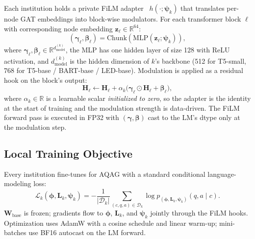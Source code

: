 \documentclass[11pt]{article}
\theoremstyle{plain}
\theoremstyle{definition}
\theoremstyle{remark}
\begin{document}
Each institution holds a private FiLM
adapter~\citep{perez2018film} $h(\cdot;
\boldsymbol{\psi}_k)$ that translates per-node GAT
embeddings into block-wise modulators. For each
transformer block $\ell$ with corresponding node
embedding $\mathbf{z}_\ell \in \mathbb{R}^{64}$:
\begin{equation}
  (\boldsymbol{\gamma}_\ell, \boldsymbol{\beta}_\ell)
  = \mathrm{Chunk}\!\left(
      \mathrm{MLP}(\mathbf{z}_\ell;
      \boldsymbol{\psi}_k)
    \right),
  \label{eq:film_mlp}
\end{equation}
where $\boldsymbol{\gamma}_\ell, \boldsymbol{\beta}_\ell
\in \mathbb{R}^{d_{\text{model}}^{(k)}}$, the MLP
has one hidden layer of size 128 with ReLU activation,
and $d_{\text{model}}^{(k)}$ is the hidden dimension
of $k$'s backbone (512 for T5-small, 768 for T5-base /
BART-base / LED-base). Modulation is applied as a
residual hook on the block's output:
\begin{equation}
  \mathbf{H}_\ell \leftarrow \mathbf{H}_\ell
  + \alpha_k \bigl(\boldsymbol{\gamma}_\ell \odot
  \mathbf{H}_\ell + \boldsymbol{\beta}_\ell\bigr),
  \label{eq:film_modulation}
\end{equation}
where $\alpha_k \in \mathbb{R}$ is a learnable scalar
\emph{initialized to zero}, so the adapter is the
identity at the start of training and the modulation
strength is data-driven. The FiLM forward pass is
executed in FP32 with $(\boldsymbol{\gamma},
\boldsymbol{\beta})$ cast to the LM's dtype only at
the modulation step.

\subsection{Local Training Objective}
\label{sec:local_obj}

Every institution fine-tunes for AQAG with a standard
conditional language-modeling loss:
\begin{equation}
  \mathcal{L}_k(\boldsymbol{\phi}, \mathbf{L}_k,
  \boldsymbol{\psi}_k)
  = -\frac{1}{|\mathcal{D}_k|}
  \!\!\sum_{(c,q,a) \in \mathcal{D}_k}\!\!
    \log p_{(\boldsymbol{\phi}, \mathbf{L}_k,
    \boldsymbol{\psi}_k)}(q, a \mid c).
  \label{eq:local_loss}
\end{equation}
$\mathbf{W}_{\text{base}}$ is frozen; gradients flow
to $\boldsymbol{\phi}$, $\mathbf{L}_k$, and
$\boldsymbol{\psi}_k$ jointly through the FiLM hooks.
Optimization uses AdamW with a cosine schedule and
linear warm-up; mini-batches use BF16 autocast on the
LM forward.
\end{document}
